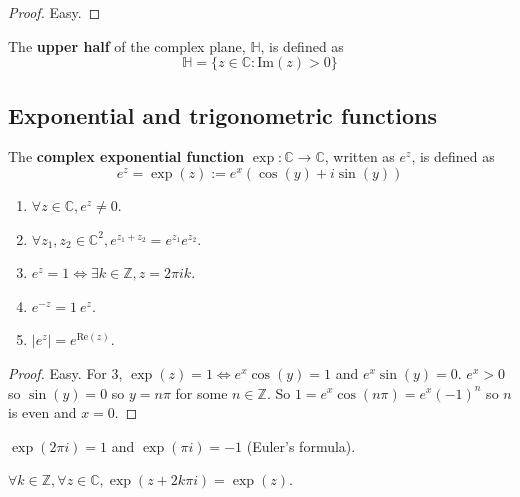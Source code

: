 \begin{proof}
	Easy.
\end{proof}

\begin{definition}
	The \textbf{upper half} of the complex plane, $\mathbb{H}$, is defined as
	\[
		\mathbb{H} = \{ z \in \mathbb{C}: \text{Im}(z) > 0 \}
	\]
\end{definition}

\subsection{Exponential and trigonometric functions}

\begin{definition}
	The \textbf{complex exponential function} $\exp: \mathbb{C} \rightarrow \mathbb{C}$, written as $e^z$, is defined as
	\[
		e^z = \exp(z) := e^x (\cos(y) + i \sin(y))
	\]
\end{definition}

\begin{proposition}\label{prop:expProperties}
	\hfill
	\begin{enumerate}
		\item $\forall z \in \mathbb{C}, e^z \ne 0$.
		\item $\forall z_1, z_2 \in \mathbb{C}^2, e^{z_1 + z_2} = e^{z_1} e^{z_2}$.
		\item $e^z = 1 \Longleftrightarrow \exists k \in \mathbb{Z}, z = 2 \pi i k$.
		\item $e^{-z} = 1 \ e^z$.
		\item $|e^z| = e^{\text{Re}(z)}$.
	\end{enumerate}
\end{proposition}

\begin{proof}
	Easy. For 3, $\exp(z) = 1 \Longleftrightarrow e^x \cos(y) = 1$ and $e^x \sin(y) = 0$. $e^x > 0$ so $\sin(y) = 0$ so $y = n \pi$ for some $n \in \mathbb{Z}$. So $1 = e^x \cos(n \pi) = e^x {(-1)}^n$ so $n$ is even and $x = 0$.
\end{proof}

\begin{corollary}\label{cor:EulersFormula}
	$\exp(2 \pi i) = 1$ and $\exp(\pi i) = -1$ (Euler's formula).
\end{corollary}

\begin{corollary}
	$\forall k \in \mathbb{Z}, \forall z \in \mathbb{C}, \exp(z + 2k \pi i) = \exp(z)$.
\end{corollary}

